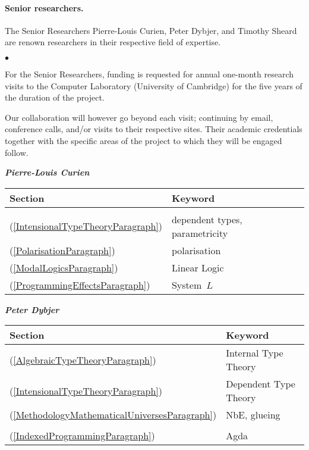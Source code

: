 \documentclass[11pt,twocolumn]{article}
\newenvironment{myitemize}
  {\begin{list}{$\bullet$}
  {\setlength{\topsep}{2pt}
   \setlength{\partopsep}{2pt}
   \setlength{\itemsep}{2.5pt}
   \setlength{\parsep}{2.5pt}
   \setlength{\leftmargin}{1em}
   \setlength{\labelwidth}{.5em}}}
  {\end{list}}
\newcommand{\SystemL}{\mbox{System~$L$}}
\begin{document}
\paragraph*{Senior researchers.}

The Senior Researchers Pierre-Louis Curien, Peter Dybjer, and Timothy
Sheard are renown researchers in their respective field of expertise.  
\begin{myitemize}
\item
For the Senior Researchers, funding is requested for annual one-month research
visits to the Computer Laboratory (University of Cambridge) for the five years
of the duration of the project.  
\end{myitemize}
Our collaboration will however go beyond each visit; continuing by email,
conference calls, and/or visits to their respective sites. 
Their academic credentials together with the specific areas of the project
to which they will be engaged follow.

\smallskip\noindent
\textbf{\em Pierre-Louis Curien}

\begin{tabular}{l|l}
Section & Keyword
\\ \hline
\\
(\ref{IntensionalTypeTheoryParagraph}) & dependent types, parametricity
\\
(\ref{PolarisationParagraph}) & polarisation
\\
(\ref{ModalLogicsParagraph}) & Linear Logic
\\
(\ref{ProgrammingEffectsParagraph}) & \SystemL
\\
\end{tabular}

\smallskip\noindent
\textbf{\em Peter Dybjer}

\begin{tabular}{l|l}
Section & Keyword
\\\hline
(\ref{AlgebraicTypeTheoryParagraph}) & Internal Type Theory
\\
(\ref{IntensionalTypeTheoryParagraph}) & Dependent Type Theory
\\
(\ref{MethodologyMathematicalUniversesParagraph}) & NbE, glueing
\\
\\
(\ref{IndexedProgrammingParagraph}) & Agda
\\
\end{tabular}
\end{document}

